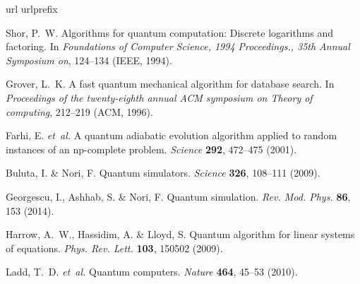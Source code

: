 \documentclass[twocolumn,reprint, amsmath,amssymb,showpacs,superscriptaddress]{revtex4-1}
\begin{document}
\begin{thebibliography}{10}
\expandafter\ifx\csname url\endcsname\relax
  \def\url#1{\texttt{#1}}\fi
\expandafter\ifx\csname urlprefix\endcsname\relax\def\urlprefix{URL }\fi
\providecommand{\bibinfo}[2]{#2}
\providecommand{\eprint}[2][]{\url{#2}}

\bibinfo{author}{Shor, P.~W.}
\newblock \bibinfo{title}{Algorithms for quantum computation: Discrete
  logarithms and factoring}.
\newblock In \emph{\bibinfo{booktitle}{Foundations of Computer Science, 1994
  Proceedings., 35th Annual Symposium on}}, \bibinfo{pages}{124--134}
  (\bibinfo{organization}{IEEE}, \bibinfo{year}{1994}).

\bibinfo{author}{Grover, L.~K.}
\newblock \bibinfo{title}{A fast quantum mechanical algorithm for database
  search}.
\newblock In \emph{\bibinfo{booktitle}{Proceedings of the twenty-eighth annual
  ACM symposium on Theory of computing}}, \bibinfo{pages}{212--219}
  (\bibinfo{organization}{ACM}, \bibinfo{year}{1996}).

\bibinfo{author}{Farhi, E.} \emph{et~al.}
\newblock \bibinfo{title}{A quantum adiabatic evolution algorithm applied to
  random instances of an np-complete problem}.
\newblock \emph{\bibinfo{journal}{Science}} \textbf{\bibinfo{volume}{292}},
  \bibinfo{pages}{472--475} (\bibinfo{year}{2001}).

\bibinfo{author}{Buluta, I.} \& \bibinfo{author}{Nori, F.}
\newblock \bibinfo{title}{Quantum simulators}.
\newblock \emph{\bibinfo{journal}{Science}} \textbf{\bibinfo{volume}{326}},
  \bibinfo{pages}{108--111} (\bibinfo{year}{2009}).

\bibinfo{author}{Georgescu, I.}, \bibinfo{author}{Ashhab, S.} \&
  \bibinfo{author}{Nori, F.}
\newblock \bibinfo{title}{Quantum simulation}.
\newblock \emph{\bibinfo{journal}{Rev. Mod. Phys.}}
  \textbf{\bibinfo{volume}{86}}, \bibinfo{pages}{153} (\bibinfo{year}{2014}).

\bibinfo{author}{Harrow, A.~W.}, \bibinfo{author}{Hassidim, A.} \&
  \bibinfo{author}{Lloyd, S.}
\newblock \bibinfo{title}{Quantum algorithm for linear systems of equations}.
\newblock \emph{\bibinfo{journal}{Phys. Rev. Lett.}}
  \textbf{\bibinfo{volume}{103}}, \bibinfo{pages}{150502}
  (\bibinfo{year}{2009}).

\bibinfo{author}{Ladd, T.~D.} \emph{et~al.}
\newblock \bibinfo{title}{Quantum computers}.
\newblock \emph{\bibinfo{journal}{Nature}} \textbf{\bibinfo{volume}{464}},
  \bibinfo{pages}{45--53} (\bibinfo{year}{2010}).


\end{thebibliography}
\end{document}
